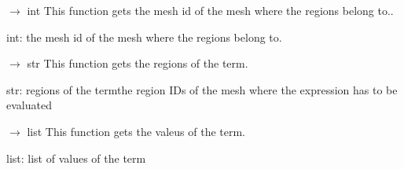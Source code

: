 \documentclass[letterpaper,10pt,english]{sphinxmanual}
\begin{document}
\begin{fulllineitems}
\begin{fulllineitems}
\begin{description}
\end{description}

\end{fulllineitems}


\begin{fulllineitems}
\label{\detokenize{scrimp:scrimp.hamiltonian.Term.get_mesh_id}}
\pysigstartsignatures
\pysiglinewithargsret
{}
{}
{{ $\rightarrow$ int}}
\pysigstopsignatures
\sphinxAtStartPar
This function gets the mesh id of the mesh where the regions belong to..
\begin{description}
\sphinxAtStartPar
int: the mesh id of the mesh where the regions belong to.

\end{description}

\end{fulllineitems}


\begin{fulllineitems}
\label{\detokenize{scrimp:scrimp.hamiltonian.Term.get_regions}}
\pysigstartsignatures
\pysiglinewithargsret
{}
{}
{{ $\rightarrow$ str}}
\pysigstopsignatures
\sphinxAtStartPar
This function gets the regions of the term.
\begin{description}
\sphinxAtStartPar
str: regions of the termthe region IDs of the mesh where the expression has to be evaluated

\end{description}

\end{fulllineitems}


\begin{fulllineitems}
\label{\detokenize{scrimp:scrimp.hamiltonian.Term.get_values}}
\pysigstartsignatures
\pysiglinewithargsret
{}
{}
{{ $\rightarrow$ list}}
\pysigstopsignatures
\sphinxAtStartPar
This function gets the valeus of the term.
\begin{description}
\sphinxAtStartPar
list: list of values of the term


\end{description}
\end{fulllineitems}
\end{fulllineitems}
\end{document}

